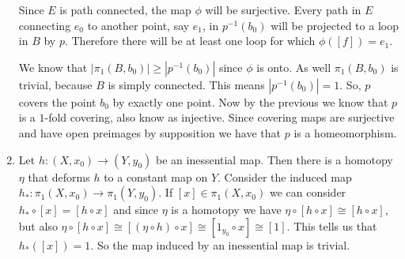 \documentclass[12pt]{report}
\begin{document}
\begin{enumerate}
Since $E$ is path connected, the map $\phi$ will be surjective. Every path in
$E$ connecting $e_0$ to another point, say $e_1$, in $p^{-1}(b_0)$ will be
projected to a loop in $B$ by $p$. Therefore there will be at least one loop for
which $\phi([f]) = e_1$.

We know that $|\pi_1(B,b_0)| \geq |p^{-1}(b_0)|$ since $\phi$ is onto. As well
$\pi_1(B,b_0)$ is trivial, because $B$ is simply connected. This means
$|p^{-1}(b_0)| = 1$. So, $p$ covers the point $b_0$ by exactly one point. Now
by the previous we know that $p$ is a $1$-fold covering, also know as injective.
Since covering maps are surjective and have open preimages by supposition we
have that $p$ is a homeomorphism.

\item Let $h: (X,x_0) \to (Y,y_0)$ be an inessential map. Then there is a
homotopy $\eta$ that deforms $h$ to a constant map on $Y$. Consider the induced
map $h_*: \pi_1(X,x_0) \to \pi_1(Y,y_0)$. If $[x] \in \pi_1(X,x_0)$ we can
consider $h_* \circ[x] = [h \circ x]$ and since $\eta$ is a homotopy we have
$\eta \circ [h \circ x] \cong [h \circ x]$, but also $\eta \circ [h \circ x]
\cong [(\eta \circ h) \circ x] \cong [1_{y_0} \circ x] \cong [1]$. This tells us
that $h_*([x]) = 1$. So the map induced by an inessential map is trivial.

\end{enumerate}
\end{document}
